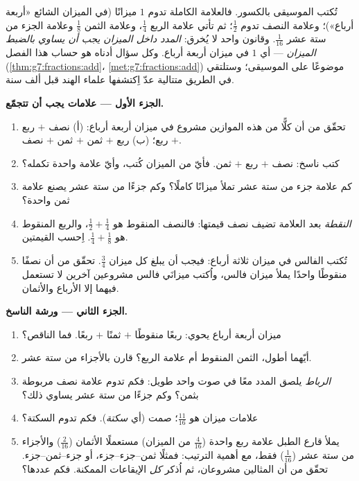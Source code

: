 \begin{problem}
\label{pb:g7:fractions:1}
تُكتب الموسيقى بالكسور. فالعلامة الكاملة تدوم $1$
ميزانًا (في الميزان الشائع «أربعة أرباع»)؛ وعلامة النصف
تدوم $\frac12$؛ ثم تأتي علامة الربع $\frac14$،
وعلامة الثمن $\frac18$ وعلامة الجزء من ستة عشر
$\frac{1}{16}$. وقانون واحد لا يُخرق: \emph{ المدد داخل
الميزان يجب أن يساوي بالضبط  الميزان} --- أي $1$ في
ميزان أربعة أرباع. وكل سؤال أدناه هو حساب هذا الفصل
(\cref{thm:g7:fractions:add}، \cref{met:g7:fractions:add}) موضوعًا
على الموسيقى؛ وستلتقي في الطريق متتالية عدّ اِكتشفها
علماء الهند قبل ألف سنة.

\medskip
\noindent\textbf{الجزء الأول --- علامات يجب أن تتجمّع.}
\begin{enumerate}
  \item تحقّق من أن كلًّا من هذه الموازين مشروع في ميزان
        أربعة أرباع: (أ) نصف $+$ ربع $+$ ربع؛ (ب) ربع $+$
        ثمن $+$ ثمن $+$ نصف.
  \item كتب ناسخ: نصف $+$ ربع $+$ ثمن. فأيّ
         من الميزان كُتب، وأيّ علامة واحدة
        تكمله؟
  \item كم علامة جزء من ستة عشر تملأ ميزانًا كاملًا؟ وكم
        جزءًا من ستة عشر يصنع علامة ثمن واحدة؟
  \item \emph{النقطة} بعد العلامة تضيف نصف قيمتها: فالنصف
        المنقوط هو $\frac12 + \frac14$، والربع المنقوط هو
        $\frac14 + \frac18$. اِحسب القيمتين.
  \item تُكتب الفالس في ميزان ثلاثة أرباع: فيجب أن يبلغ كل ميزان
        $\frac34$. تحقّق من أن نصفًا منقوطًا واحدًا يملأ
        ميزان فالس، واُكتب ميزانَي فالس مشروعين آخرين
        لا تستعمل فيهما إلا الأرباع والأثمان.
\end{enumerate}

\medskip
\noindent\textbf{الجزء الثاني --- ورشة الناسخ.}
\begin{enumerate}[resume]
  \item ميزان أربعة أرباع يحوي: ربعًا منقوطًا $+$ ثمنًا
        $+$ ربعًا. فما الناقص؟
  \item أيّهما أطول، الثمن المنقوط أم علامة الربع؟
        قارن بالأجزاء من ستة عشر.
  \item \emph{الرباط} يلصق المدد معًا في صوت واحد
        طويل: فكم تدوم علامة نصف مربوطة بثمن؟ وكم
        جزءًا من ستة عشر يساوي ذلك؟
  \item {} علامات ميزان هو $\frac{11}{16}$؛
         صمت (أي \emph{سكتة}). فكم تدوم
        السكتة؟
  \item يملأ قارع الطبل علامة ربع واحدة ($\frac{4}{16}$ من
        الميزان) مستعملًا الأثمان ($\frac{2}{16}$)
        والأجزاء من ستة عشر ($\frac{1}{16}$) فقط، مع أهمية الترتيب: فمثلًا
        ثمن--جزء--جزء، أو
        جزء--ثمن--جزء. تحقّق من أن المثالين
        مشروعان، ثم اُذكر \emph{كل} الإيقاعات الممكنة.
        فكم عددها؟
\end{enumerate}


\end{problem}
